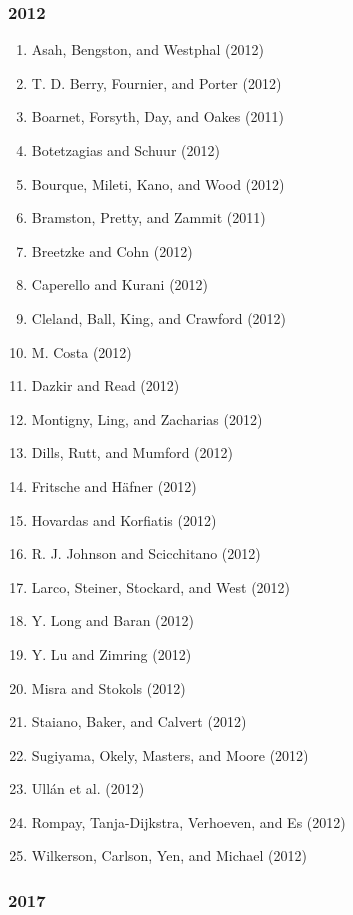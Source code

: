 \documentclass[english,man]{apa6}
\providecommand{\tightlist}{%
  \setlength{\itemsep}{0pt}\setlength{\parskip}{0pt}}
\theoremstyle{definition}
\theoremstyle{definition}
\theoremstyle{definition}
\theoremstyle{remark}
\begin{document}
\subsubsection{2012}\label{section-20}

\begin{enumerate}
\def\labelenumi{\arabic{enumi})}
\tightlist
\item
  Asah, Bengston, and Westphal (2012)
\item
  T. D. Berry, Fournier, and Porter (2012)
\item
  Boarnet, Forsyth, Day, and Oakes (2011)
\item
  Botetzagias and Schuur (2012)
\item
  Bourque, Mileti, Kano, and Wood (2012)
\item
  Bramston, Pretty, and Zammit (2011)
\item
  Breetzke and Cohn (2012)
\item
  Caperello and Kurani (2012)
\item
  Cleland, Ball, King, and Crawford (2012)
\item
  M. Costa (2012)
\item
  Dazkir and Read (2012)
\item
  Montigny, Ling, and Zacharias (2012)
\item
  Dills, Rutt, and Mumford (2012)
\item
  Fritsche and Häfner (2012)
\item
  Hovardas and Korfiatis (2012)
\item
  R. J. Johnson and Scicchitano (2012)
\item
  Larco, Steiner, Stockard, and West (2012)
\item
  Y. Long and Baran (2012)
\item
  Y. Lu and Zimring (2012)
\item
  Misra and Stokols (2012)
\item
  Staiano, Baker, and Calvert (2012)
\item
  Sugiyama, Okely, Masters, and Moore (2012)
\item
  Ullán et al. (2012)
\item
  Rompay, Tanja-Dijkstra, Verhoeven, and Es (2012)
\item
  Wilkerson, Carlson, Yen, and Michael (2012)
\end{enumerate}

\subsubsection{2017}\label{section-21}
\end{document}
